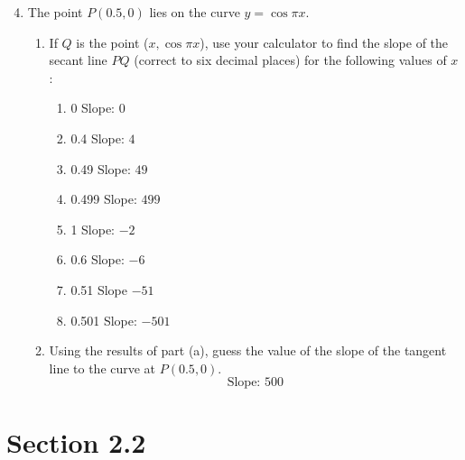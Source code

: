 \documentclass{article}
\begin{document}
\begin{enumerate}
\setcounter{enumi}{3}
	\item The point $P(0.5,0)$ lies on the curve $y=\cos \pi x$.
	\begin{enumerate}
		\item If $Q$ is the point ($x, \cos \pi x$), use your calculator to find the slope of the secant line $PQ$ (correct to six decimal places) for the following values of $x$:
			\begin{enumerate}
				\item 0 \qquad Slope: $0$
				\item 0.4 \qquad Slope: $4$
				\item 0.49 \qquad Slope: $49$
				\item 0.499 \qquad Slope: $499$
				\item 1 \qquad Slope: $-2$
				\item 0.6 \qquad Slope: $-6$
				\item 0.51 \qquad Slope $-51$
				\item 0.501 \qquad Slope: $-501$
			\end{enumerate}
			\item Using the results of part (a), guess the value of the slope of the tangent line to the curve at $P(0.5,0)$.
			 $$\text{Slope: }500$$
	\end{enumerate}

\end{enumerate}


\section{Section 2.2}
\end{document}
